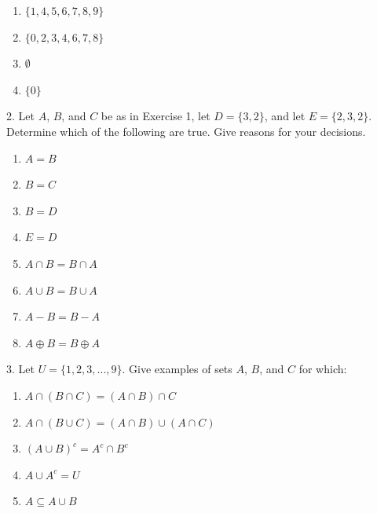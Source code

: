\documentclass[10pt,]{book}
\theoremstyle{plain}
\theoremstyle{definition}
\theoremstyle{definition}
\theoremstyle{definition}
\theoremstyle{definition}
\begin{document}
\begin{exercisegroup}
\begin{multicols}{3}
\begin{enumerate}[label=\alph*]
\item\hypertarget{li-92}{}\(\{ 1,4,5,6,7,8,9\}\) %
\item\hypertarget{li-93}{} \(\{0,2,3,4,6,7,8\}\)%
\item\hypertarget{li-94}{} \(\emptyset\) %
\item\hypertarget{li-95}{} \(\{0\}\)%
\end{enumerate}
\end{multicols}
%
\item[2.]\hypertarget{exercise-8}{}  Let \( A\), \( B\), and \( C\) be as in Exercise 1, let \(D = \{3, 2\}\), and let \(E = \{2, 3, 2\}\). Determine which of the
following are true. Give reasons for your decisions. %
\par
\leavevmode%
\begin{multicols}{2}
\begin{enumerate}[label=\alph*]
\item\hypertarget{li-96}{}  \(A = B\) %
\item\hypertarget{li-97}{}  \(B = C\) %
\item\hypertarget{li-98}{}  \(B = D\) %
\item\hypertarget{li-99}{}  \(E=D\)%
\item\hypertarget{li-100}{}  \(A\cap B = B\cap A\)%
\item\hypertarget{li-101}{}  \(A \cup  B = B \cup  A\) %
\item\hypertarget{li-102}{}  \(A-B = B-A\) %
\item\hypertarget{li-103}{}  \(A \oplus  B = B \oplus  A\) %
\end{enumerate}
\end{multicols}
%
\par\smallskip
\item[3.]\hypertarget{exercise-9}{}  Let \(U= \{1, 2, 3, . . . , 9\}\). 
Give examples of sets \( A\), \( B\), and \( C\) for which:
%
\par
\leavevmode%
\begin{multicols}{2}
\begin{enumerate}[label=\alph*]
\item\hypertarget{li-104}{}  \(A\cap (B\cap C)=(A\cap B)\cap C\) %
\item\hypertarget{li-105}{}  \(A\cap (B\cup C)=(A\cap B)\cup (A\cap C)\)%
\item\hypertarget{li-106}{}  \((A \cup  B)^c= A^c\cap B^c\) %
\item\hypertarget{li-107}{}  \(A \cup  A^c = U\)%
\item\hypertarget{li-108}{}  \(A \subseteq A\cup B\)%

\end{enumerate}
\end{multicols}
\end{exercisegroup}
\end{document}
